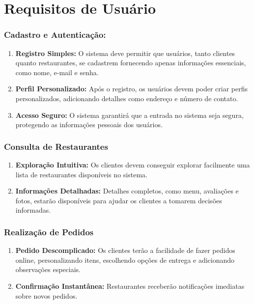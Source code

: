 \section{Requisitos de Usuário}

\subsubsection*{Cadastro e Autenticação:}

\begin{enumerate}[label=1.\arabic*]
    \item \textbf{Registro Simples:} O sistema deve permitir que usuários, tanto clientes quanto restaurantes, se cadastrem fornecendo apenas informações essenciais, como nome, e-mail e senha.

    \item \textbf{Perfil Personalizado:} Após o registro, os usuários devem poder criar perfis personalizados, adicionando detalhes como endereço e número de contato.

    \item \textbf{Acesso Seguro:} O sistema garantirá que a entrada no sistema seja segura, protegendo as informações pessoais dos usuários.

\end{enumerate}

\subsubsection*{Consulta de Restaurantes}

\begin{enumerate}[label=2.\arabic*]
    \item \textbf{Exploração Intuitiva:} Os clientes devem conseguir explorar facilmente uma lista de restaurantes disponíveis no sistema.

    \item \textbf{Informações Detalhadas:} Detalhes completos, como menu, avaliações e fotos, estarão disponíveis para ajudar os clientes a tomarem decisões informadas.

\end{enumerate}

\subsubsection*{Realização de Pedidos}

\begin{enumerate}[label=3.\arabic*]
    \item \textbf{Pedido Descomplicado:} Os clientes terão a facilidade de fazer pedidos online, personalizando itens, escolhendo opções de entrega e adicionando observações especiais.

    \item \textbf{Confirmação Instantânea:} Restaurantes receberão notificações imediatas sobre novos pedidos.

\end{enumerate}

